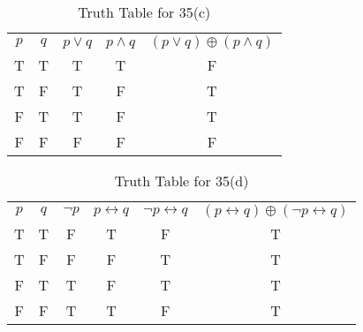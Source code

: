\documentclass{Axon}
\begin{document}
\begin{table}[ht]
    \centering
    \begin{tabular}{c|c|c|c|c}
    \(p\) & \(q\) & \(p \lor q\) & \(p \land q\) & \((p \lor q) \oplus (p \land q)\) \\
    T     & T     & T            & T             & F                                 \\
    T     & F     & T            & F             & T                                 \\
    F     & T     & T            & F             & T                                 \\
    F     & F     & F            & F             & F
    \end{tabular}
    \caption{Truth Table for 35(c)}
\end{table}

\begin{table}[ht]
    \centering
    \begin{tabular}{c|c|c|c|c|c}
        \(p\) & \(q\) & \(\lnot p\) & \(p \leftrightarrow q\) & \(\lnot p \leftrightarrow q\) & \((p \leftrightarrow q) \oplus (\lnot p \leftrightarrow q)\) \\
        T     & T     & F           & T                       & F                             & T                                                            \\
        T     & F     & F           & F                       & T                             & T                                                            \\
        F     & T     & T           & F                       & T                             & T                                                            \\
        F     & F     & T           & T                       & F                             & T
    \end{tabular}
    \caption{Truth Table for 35(d)}
\end{table}
\end{document}
